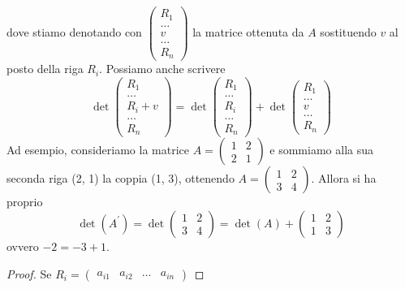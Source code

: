 \begin{enumerate}
  dove stiamo denotando con $\begin{pmatrix} R_1 \\ \dots \\ v\\ \dots \\ R_n \end{pmatrix}$ la matrice ottenuta da $A$ sostituendo $v$ al posto della riga $R_i$. Possiamo anche scrivere
  \begin{equation}
	\det\begin{pmatrix} R_1 \\ \dots \\ R_i+v\\ \dots \\ R_n \end{pmatrix}=\det\begin{pmatrix} R_1 \\ \dots \\ R_i\\ \dots \\ R_n \end{pmatrix}+\det \begin{pmatrix} R_1 \\ \dots \\ v\\ \dots \\ R_n \end{pmatrix}
  \end{equation}
  Ad esempio, consideriamo la matrice $A=\begin{pmatrix} 1 & 2 \\ 2 & 1 \end{pmatrix}$ e sommiamo
  alla sua seconda riga (2, 1) la coppia (1, 3), ottenendo  $A=\begin{pmatrix} 1 & 2 \\ 3 & 4 \end{pmatrix}$. Allora si ha proprio
  \begin{equation*}
	\det(A^\prime)=\det\begin{pmatrix} 1 & 2 \\ 3 & 4 \end{pmatrix}=\det(A)+\begin{pmatrix} 1 & 2 \\ 1 & 3 \end{pmatrix}
  \end{equation*}
  ovvero $-2=-3+1$.
		\begin{proof}
			Se $R_i=\begin{pmatrix}a_{i1} & a_{i2} & \dots & a_{in}\end{pmatrix}$

\end{proof}
\end{enumerate}

